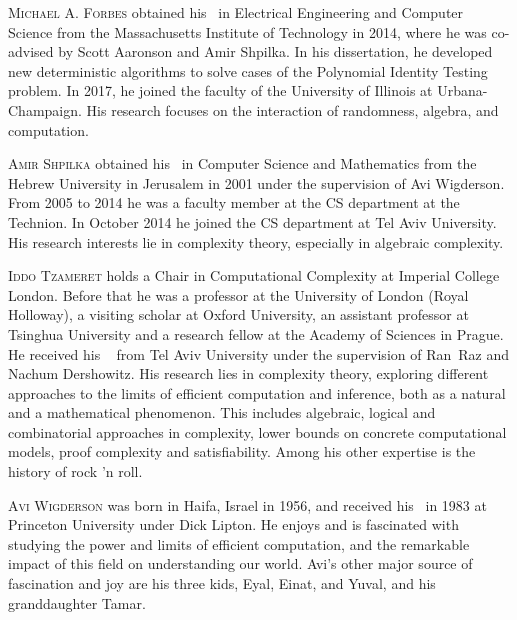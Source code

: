 \documentclass{toc}
\begin{document}
%
%
%
%
%
%
%
%
%
%
%
%
%
%
%
%
%
%
%
%
\begin{tocaboutauthors}
\begin{tocabout}[forbes]
  \textsc{Michael A. Forbes} obtained his \phd\ in Electrical Engineering and Computer Science from the Massachusetts Institute of Technology in 2014, where he was co-advised by Scott Aaronson and Amir Shpilka.
In his dissertation, he  %
developed new deterministic algorithms to solve cases of the
%
Polynomial Identity Testing   %
problem. In 2017, he joined the faculty of
the  %
University of Illinois at Urbana-Champaign. His research focuses on
the  %
interaction of randomness, algebra, and computation.

%
%
%
%
%
%
%
%
%
%
%
%
%
%
%
\end{tocabout}
\begin{tocabout}[shpilka]
\textsc{Amir Shpilka} obtained his \phd\ in Computer Science and Mathematics from the Hebrew University in Jerusalem in 2001 under the supervision of Avi Wigderson. From 2005 to 2014 he was a faculty member at the CS department at the Technion. In October 2014 he joined the CS department at
%
Tel Aviv University.  %
His research interests lie in complexity theory, especially in algebraic complexity.
\end{tocabout}

\begin{tocabout}[tzameret]
  \textsc{Iddo Tzameret} holds a Chair in Computational Complexity at Imperial College London. Before that he
%
was  %
a professor at
the  %
University of London (Royal Holloway), a visiting scholar at Oxford University, an assistant professor at Tsinghua University and a research fellow at the Academy of Sciences in Prague. He received his \phd\
%
from  %
Tel Aviv University under the supervision of \mbox{Ran Raz} and Nachum Dershowitz. His research lies in complexity theory, exploring different approaches to the limits of efficient computation and inference, both as a natural and a mathematical phenomenon. This includes algebraic, logical and combinatorial approaches in complexity, lower bounds on concrete computational models, proof complexity and satisfiability. Among his other expertise is the history of rock 'n roll.
\end{tocabout}
\begin{tocabout}[wigderson]
\textsc{Avi Wigderson} was born in Haifa, Israel in 1956, and received his \phd\ in 1983 at Princeton University under Dick Lipton. He enjoys and is fascinated with studying the power and limits of efficient computation, and the remarkable impact of this field on understanding our world. Avi's other major source of fascination and joy are his three kids, Eyal, Einat, and Yuval, and his granddaughter Tamar.
\end{tocabout}
\end{tocaboutauthors}
\end{document}
